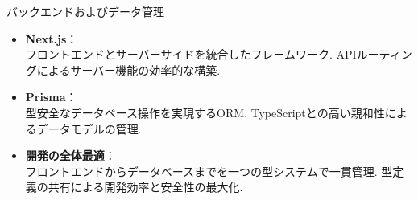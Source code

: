 \documentclass[aspectratio=169]{beamer}
\begin{document}
\begin{frame}{バックエンドおよびデータ管理}
\begin{itemize}
  \setlength{\parskip}{0.5em}
    \item \textbf{Next.js}：\\ フロントエンドとサーバーサイドを統合したフレームワーク. APIルーティングによるサーバー機能の効率的な構築.
    \item \textbf{Prisma}：\\ 型安全なデータベース操作を実現するORM. TypeScriptとの高い親和性によるデータモデルの管理.
    \item \textbf{開発の全体最適}：\\ フロントエンドからデータベースまでを一つの型システムで一貫管理. 型定義の共有による開発効率と安全性の最大化.
\end{itemize}
\vspace{0.3cm}

\end{frame}
\end{document}
